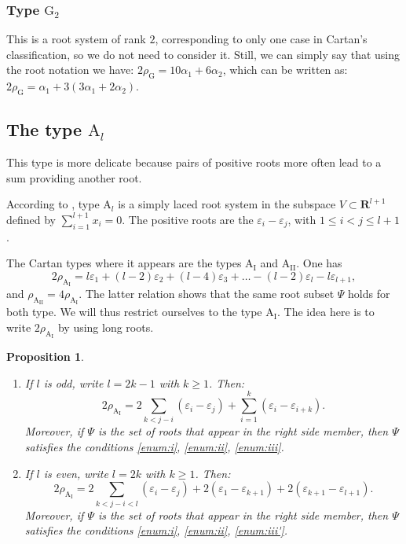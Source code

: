 \documentclass[JEP,XML,SOM,Unicode,published]{cedram}
\newcommand{\rI}{\mathrm{I}}
\newcommand{\RR}{\mathbf{R}}
\theoremstyle{plain}
\newtheorem{proposition}[equation]{Proposition}
\theoremstyle{remark}
\theoremstyle{definition}
\begin{document}
\subsubsection*{Type $\mathrm{G}_2$
\cite[Planche IX, p.\,274]{BBK-Lie-4to6}}
This is a root system of rank $2$, corresponding to only one case in Cartan's classification, so we do not need to consider it.
Still, we can simply say that using the root notation we have:
$2\rho_\mathrm{G} = 10 \alpha_1 + 6 \alpha_2$,
which can be written as: $2\rho_\mathrm{G} = \alpha_1 + 3(3\alpha_1+2\alpha_2)$.

\subsection{The type $\mathrm A_l$}
\label{ss - type A}
This type is more delicate because pairs of positive roots more often lead to a sum providing another root.

According to \cite[Planche I, p.\,250]{BBK-Lie-4to6}, type $\mathrm A_l$ is a simply laced root system in the subspace $V \subset \RR^{l+1}$
defined by $\sum_{i=1}^{l+1} x_i = 0$. The positive roots are the $\varepsilon_i - \varepsilon_j$, with $1\leqslant i<j \leqslant l+1$.

The Cartan types where it appears are the types $\mathrm{A}_\rI$ and $\mathrm{A}_\mathrm{II}$.
One has
\[2 \rho_{\mathrm{A}_\rI} = l \varepsilon_1 + (l-2)\varepsilon_2 + (l-4) \varepsilon_3
+ \dots - (l-2) \varepsilon_l - l\varepsilon_{l+1},\]
and $\rho_{\mathrm{A}_\mathrm{II}} = 4 \rho_{\mathrm{A}_\rI}$. The latter relation shows that the same root subset $\Psi$ holds for both type.
We will thus restrict ourselves to the type $\mathrm{A}_\rI$. The idea here is to write $2 \rho_{\mathrm{A}_\rI}$ by using
long roots.

\skpt
\begin{proposition}
\begin{enumerate}
\item
If $l$ is odd, write $l = 2k-1$ with $k \geqslant 1$.
Then:\vspace*{-3pt}
\[2 \rho_{\mathrm{A}_\rI}= 2 \sum_{k<j-i} (\varepsilon_i - \varepsilon_j)
+ \sum_{i = 1}^k (\varepsilon_i - \varepsilon_{i+k}).\]
Moreover, if $\Psi$ is the set of roots that appear in the right side member, then $\Psi$ satisfies the conditions \eqref{enum:i}, \eqref{enum:ii}, \eqref{enum:iii}.

\item
If $l$ is even, write $l =2k$ with $k \geqslant 1$.
Then:\vspace*{-3pt}
\[2\rho_{\mathrm{A}_\rI}=
2\sum_{k<j-i<l} (\varepsilon_i - \varepsilon_j)
+ 2(\varepsilon_1 - \varepsilon_{k+1}) +
2(\varepsilon_{k+1} - \varepsilon_{l+1}).\]
Moreover, if $\Psi$ is the set of roots that appear in the right side member, then $\Psi$ satisfies the conditions
\eqref{enum:i}, \eqref{enum:ii}, \eqref{enum:iii'}.
\end{enumerate}
\end{proposition}
\end{document}
